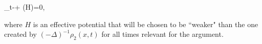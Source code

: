 \documentclass[12pt,reqno]{amsart}
\begin{document}
\begin{imaths} 
\partial_t\rho-\Delta \rho + \nabla \cdot \left(\rho \nabla  H\right)=0,
\end{imaths}
where $H$ is an effective potential that will be chosen to be ``weaker" than the one created by
$(-\Delta)^{-1} \rho_2(x,t)$ for all times relevant for the argument.
\begin{comment}
solves the Poisson equation with source $q$, i.e.,
\begin{imaths}
H_q(x)=\left( -\Delta \right) ^{-1}q(x)=-\frac{1}{2}\int_{\mathbb{R}}|x-y|q(y)dy.
\end{imaths}
Then the drift created by $q$ is
\begin{imaths}
\overrightarrow {v_q}\left( x,t\right) =\nabla \left( \left( -\Delta \right) ^{-1}q\right) \left( x,t\right) =\dfrac {1}{2}\left( \int ^{\infty }_{x}q\left( y\right) dy-\int ^{x}_{-\infty }q\left( y\right) dy\right) .
\end{imaths}
Without loss of generality, from now on, we will assume $\rho_1$ starts at the right side of $\rho_2$ with distance $L $ away from the origin. Denote $\gamma=||\rho_2(\cdot,0)||_{L^1}$, $M=||\rho_1(\cdot,0)||_{L^1}$. The regime we are particularly interested in is $M\gg\gamma\gg 1, M\gg\epsilon^{-1}$. Suppose that initially $\rho_2$ is concentrated on the interval $[-\frac{1}{2},\frac{1}{2}]$, and assume for simplicity that the density of $\rho_2(\cdot,0)$ is uniform.
\end{comment}
\end{document}
